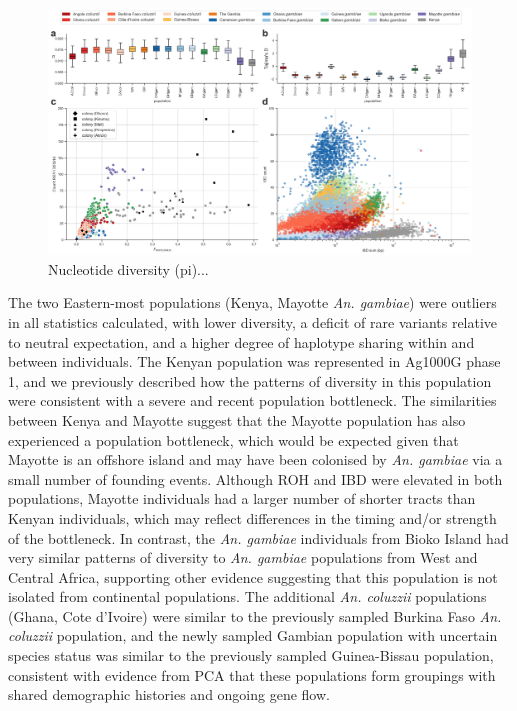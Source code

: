 \documentclass[a4paper,11pt,abstracton,hidelinks]{scrartcl}
\begin{document}
\begin{figure}[H]
	\begin{center}
		\includegraphics*[width=6.3in]{artwork/diversity_composite.jpeg}
	\end{center}
	\caption{Nucleotide diversity (pi)...}
	\label{div}
\end{figure}


%
The two Eastern-most populations (Kenya, Mayotte \textit{An. gambiae}) were outliers in all statistics calculated, with lower diversity, a deficit of rare variants relative to neutral expectation, and a higher degree of haplotype sharing within and between individuals.
%
The Kenyan population was represented in Ag1000G phase 1, and we previously described how the patterns of diversity in this population were consistent with a severe and recent population bottleneck.
%
The similarities between Kenya and Mayotte suggest that the Mayotte population has also experienced a population bottleneck, which would be expected given that Mayotte is an offshore island and may have been colonised by \textit{An. gambiae} via a small number of founding events.
%
Although ROH and IBD were elevated in both populations, Mayotte individuals had a larger number of shorter tracts than Kenyan individuals, which may reflect differences in the timing and/or strength of the bottleneck.
%
In contrast, the \textit{An. gambiae} individuals from Bioko Island had very similar patterns of diversity to \textit{An. gambiae} populations from West and Central Africa, supporting other evidence suggesting that this population is not isolated from continental populations.
%
The additional \textit{An. coluzzii} populations (Ghana, Cote d'Ivoire) were similar to the previously sampled Burkina Faso \textit{An. coluzzii} population, and the newly sampled Gambian population with uncertain species status was similar to the previously sampled Guinea-Bissau population, consistent with evidence from PCA that these populations form groupings with shared demographic histories and ongoing gene flow.
\end{document}
